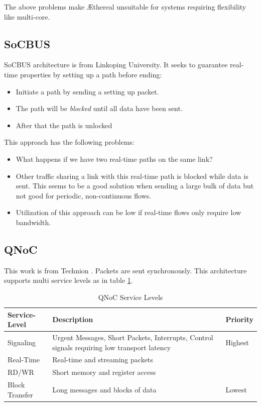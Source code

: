 \documentclass[conference, twocolumn]{IEEEtran}
\theoremstyle{definition}
\begin{document}
The above problems make \AE thereal unsuitable for systems requiring
flexibility like multi-core.

\subsection{SoCBUS}
SoCBUS architecture \cite{SoCBUS} is from Linkoping University. It seeks to 
guarantee real-time properties by setting up a path before ending:
\begin{itemize}
\item Initiate a path by sending a setting up packet.
\item The path will be {\em blocked} until all data have been sent.
\item After that the path is unlocked
\end{itemize}
This approach has the following problems: 
\begin{itemize}
\item What happens if we have two real-time paths on the same link?
\item Other traffic sharing a link with this real-time path is blocked while 
data is sent. This seems to be a good solution when sending a large bulk of data 
but not good for periodic, non-continuous flows.
\item Utilization of this approach can be low if real-time flows only require
low bandwidth.
\end{itemize}
\subsection{QNoC}
This work is from Technion \cite{QNoC}. Packets are sent synchronously. 
This architecture supports multi service levels as in table \ref{table:QNoCTable}.

\begin{table}[htbp]
\begin{center}
  \begin{tabular}{ | p{2.3cm} | p{4cm} | p{1.2cm} |}
    \hline
	Service-Level & Description & Priority \\ \hline
	Signaling & Urgent Messages, Short Packets, Interrupts, Control signals 
	requiring low transport latency & Highest \\ \hline
	Real-Time & Real-time and streaming packets & \\ \hline
	RD/WR & Short memory and register access & \\ \hline
	Block Transfer & Long messages and blocks of data & Lowest \\
    \hline
  \end{tabular}
\end{center}
\caption{QNoC Service Levels}
\label{table:QNoCTable}
\end{table}
\end{document}
